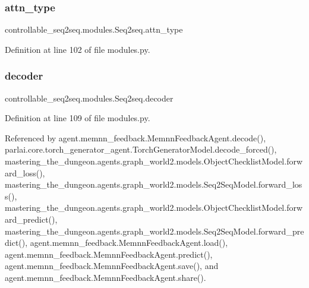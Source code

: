 \subsubsection{\texorpdfstring{attn\+\_\+type}{attn\_type}}
{\footnotesize\ttfamily controllable\+\_\+seq2seq.\+modules.\+Seq2seq.\+attn\+\_\+type}



Definition at line 102 of file modules.\+py.

\mbox{\label{classcontrollable__seq2seq_1_1modules_1_1Seq2seq_ae781db54c21b31be8b07e40505f6e60d}} 
\subsubsection{\texorpdfstring{decoder}{decoder}}
{\footnotesize\ttfamily controllable\+\_\+seq2seq.\+modules.\+Seq2seq.\+decoder}



Definition at line 109 of file modules.\+py.



Referenced by agent.\+memnn\+\_\+feedback.\+Memnn\+Feedback\+Agent.\+decode(), parlai.\+core.\+torch\+\_\+generator\+\_\+agent.\+Torch\+Generator\+Model.\+decode\+\_\+forced(), mastering\+\_\+the\+\_\+dungeon.\+agents.\+graph\+\_\+world2.\+models.\+Object\+Checklist\+Model.\+forward\+\_\+loss(), mastering\+\_\+the\+\_\+dungeon.\+agents.\+graph\+\_\+world2.\+models.\+Seq2\+Seq\+Model.\+forward\+\_\+loss(), mastering\+\_\+the\+\_\+dungeon.\+agents.\+graph\+\_\+world2.\+models.\+Object\+Checklist\+Model.\+forward\+\_\+predict(), mastering\+\_\+the\+\_\+dungeon.\+agents.\+graph\+\_\+world2.\+models.\+Seq2\+Seq\+Model.\+forward\+\_\+predict(), agent.\+memnn\+\_\+feedback.\+Memnn\+Feedback\+Agent.\+load(), agent.\+memnn\+\_\+feedback.\+Memnn\+Feedback\+Agent.\+predict(), agent.\+memnn\+\_\+feedback.\+Memnn\+Feedback\+Agent.\+save(), and agent.\+memnn\+\_\+feedback.\+Memnn\+Feedback\+Agent.\+share().

\mbox{\label{classcontrollable__seq2seq_1_1modules_1_1Seq2seq_ad071948b0df5e3a8605e3ad79f911188}} 
